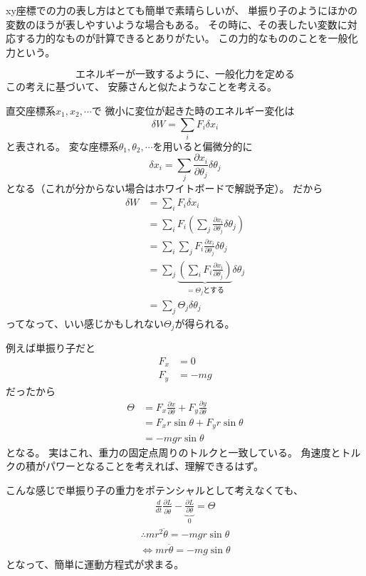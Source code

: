 \documentclass[a4paper,11pt]{jsarticle}
\begin{document}
xy座標での力の表し方はとても簡単で素晴らしいが、
単振り子のようにほかの変数のほうが表しやすいような場合もある。
その時に、その表したい変数に対応する力的なものが計算できるとありがたい。
この力的なもののことを一般化力という。

\[
  エネルギーが一致するように、一般化力を定める
\]
この考えに基づいて、
安藤さんと似たようなことを考える。

直交座標系$x_1, x_2, \cdots$で
微小に変位が起きた時のエネルギー変化は
\[
  \delta W = \sum_i F_i\delta x_i
\]
と表される。
変な座標系$\theta_1, \theta_2, \cdots$を用いると偏微分的に
\[
  \delta x_i = \sum_j \frac{\partial x_i}{\partial \theta_j}\delta \theta_j
\]
となる（これが分からない場合はホワイトボードで解説予定）。
だから
\begin{align*}
  \delta W &= \sum_i F_i\delta x_i
  \\ &= \sum_i F_i\left(\sum_j \frac{\partial x_i}{\partial \theta_j}\delta \theta_j\right)
  \\ &= \sum_i \sum_j F_i\frac{\partial x_i}{\partial \theta_j}\delta \theta_j
  \\ &= \sum_j 
  \underbrace{\left(\sum_i F_i\frac{\partial x_i}{\partial \theta_j}\right)}_{=\Theta_jとする}
  \delta \theta_j
  \\ &= \sum_j \Theta_j\delta \theta_j
\end{align*}
ってなって、いい感じかもしれない$\Theta_j$が得られる。

例えば単振り子だと
\begin{align*}
  F_x &= 0
  \\ F_y &= -mg
\end{align*}
だったから
\begin{align*}
  \Theta &= F_x \frac{\partial x}{\partial \theta} + F_y \frac{\partial y}{\partial \theta}
  \\ &= F_x r\sin\theta + F_y r\sin\theta
  \\ &= -mgr\sin\theta
\end{align*}
となる。
実はこれ、重力の固定点周りのトルクと一致している。
角速度とトルクの積がパワーとなることを考えれば、理解できるはず。

こんな感じで単振り子の重力をポテンシャルとして考えなくても、
\begin{align*}
  \frac{d}{dt}\frac{\partial L}{\partial \dot{\theta}} 
  - \underbrace{\frac{\partial L}{\partial \theta}}_{0} = \Theta
\end{align*}
\begin{align*}
  \therefore mr^2\ddot{\theta} = -mgr\sin\theta
\end{align*}
\begin{align*}
  \Leftrightarrow mr\ddot{\theta} = -mg\sin\theta
\end{align*}
となって、簡単に運動方程式が求まる。
\end{document}
